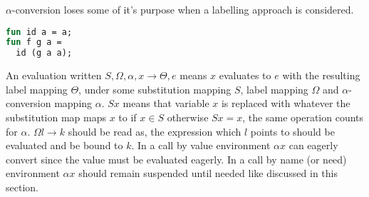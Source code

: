 \documentclass[11pt,oneside,a4paper]{report}
\begin{document}
$\alpha$-conversion loses some of it's purpose when a labelling approach is considered.
\begin{lstlisting}[language=ML,caption={Program},label={lst:labeltest},mathescape=true]
fun id a = a;
fun f g a =
  id (g a a);
\end{lstlisting}




An evaluation written $S, \Omega, \alpha, x \rightarrow \Theta, e$ means $x$ evaluates to $e$ with the resulting label mapping $\Theta$, under some substitution mapping $S$, label mapping $\Omega$ and $\alpha$-conversion mapping $\alpha$.
$Sx$ means that variable $x$ is replaced with whatever the substitution map maps $x$ to if $x \in S$ otherwise $Sx = x$, the same operation counts for $\alpha$.
$\Omega l \rightarrow k$ should be read as, the expression which $l$ points to should be evaluated and be bound to $k$.
In a call by value environment $\alpha x$ can eagerly convert since the value must be evaluated eagerly.
In a call by name (or need) environment $\alpha x$ should remain suspended until needed like discussed in this section.

\end{document}
